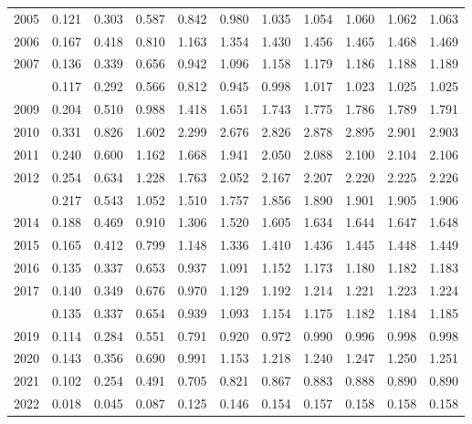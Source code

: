 \documentclass[
]{article}
\begin{document}
\begin{longtable}[t]{lrrrrrrrrrr}
2005 & 0.121 & 0.303 & 0.587 & 0.842 & 0.980 & 1.035 & 1.054 & 1.060 & 1.062 & 1.063\\
2006 & 0.167 & 0.418 & 0.810 & 1.163 & 1.354 & 1.430 & 1.456 & 1.465 & 1.468 & 1.469\\
2007 & 0.136 & 0.339 & 0.656 & 0.942 & 1.096 & 1.158 & 1.179 & 1.186 & 1.188 & 1.189\\
\addlinespace
2008 & 0.117 & 0.292 & 0.566 & 0.812 & 0.945 & 0.998 & 1.017 & 1.023 & 1.025 & 1.025\\
2009 & 0.204 & 0.510 & 0.988 & 1.418 & 1.651 & 1.743 & 1.775 & 1.786 & 1.789 & 1.791\\
2010 & 0.331 & 0.826 & 1.602 & 2.299 & 2.676 & 2.826 & 2.878 & 2.895 & 2.901 & 2.903\\
2011 & 0.240 & 0.600 & 1.162 & 1.668 & 1.941 & 2.050 & 2.088 & 2.100 & 2.104 & 2.106\\
2012 & 0.254 & 0.634 & 1.228 & 1.763 & 2.052 & 2.167 & 2.207 & 2.220 & 2.225 & 2.226\\
\addlinespace
2013 & 0.217 & 0.543 & 1.052 & 1.510 & 1.757 & 1.856 & 1.890 & 1.901 & 1.905 & 1.906\\
2014 & 0.188 & 0.469 & 0.910 & 1.306 & 1.520 & 1.605 & 1.634 & 1.644 & 1.647 & 1.648\\
2015 & 0.165 & 0.412 & 0.799 & 1.148 & 1.336 & 1.410 & 1.436 & 1.445 & 1.448 & 1.449\\
2016 & 0.135 & 0.337 & 0.653 & 0.937 & 1.091 & 1.152 & 1.173 & 1.180 & 1.182 & 1.183\\
2017 & 0.140 & 0.349 & 0.676 & 0.970 & 1.129 & 1.192 & 1.214 & 1.221 & 1.223 & 1.224\\
\addlinespace
2018 & 0.135 & 0.337 & 0.654 & 0.939 & 1.093 & 1.154 & 1.175 & 1.182 & 1.184 & 1.185\\
2019 & 0.114 & 0.284 & 0.551 & 0.791 & 0.920 & 0.972 & 0.990 & 0.996 & 0.998 & 0.998\\
2020 & 0.143 & 0.356 & 0.690 & 0.991 & 1.153 & 1.218 & 1.240 & 1.247 & 1.250 & 1.251\\
2021 & 0.102 & 0.254 & 0.491 & 0.705 & 0.821 & 0.867 & 0.883 & 0.888 & 0.890 & 0.890\\
2022 & 0.018 & 0.045 & 0.087 & 0.125 & 0.146 & 0.154 & 0.157 & 0.158 & 0.158 & 0.158\\*
\end{longtable}
\end{document}
